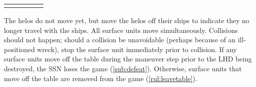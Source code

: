 \documentclass[../TacSubMicroRules.tex]{subfiles}
\begin{document}
\begin{Table}
    \centering
    \begin{tabular}{R{0.25\linewidth}|C{0.2\linewidth}|L{0.35\linewidth}}
        \hline
        \hline
        \hline
        \hline
    \end{tabular}
    \label{tab:speed}
\end{Table}

 
The helos do not move yet, but move the helos off their ships to indicate they no longer travel with the ships.
All surface units move simultaneously.
Collisions should not happen; should a collision be unavoidable (perhaps because of an ill-positioned wreck), stop the surface unit immediately prior to collision.
If any surface units move off the table during the maneuver step prior to the LHD being destroyed, the SSN loses the game (\ref{sub:defeat}).
Otherwise, surface units that move off the table are removed from the game (\ref{rul:leavetable}).
\end{document}
